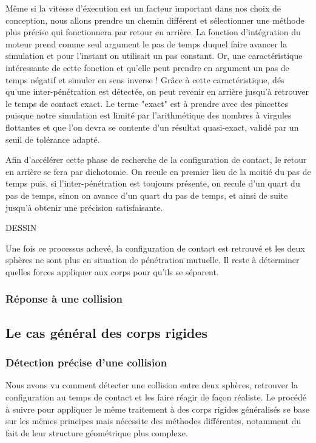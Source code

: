 \documentclass[twocolumn]{article}
\begin{document}
Même si la vitesse d'éxecution est un facteur important dans nos choix de conception, nous allons prendre un chemin différent et sélectionner une méthode plus précise qui fonctionnera par retour en arrière. La fonction d'intégration du moteur prend comme seul argument le pas de temps duquel faire avancer la simulation et pour l'instant on utilisait un pas constant. Or, une caractéristique intéressante de cette fonction et qu'elle peut prendre en argument un pas de temps négatif et simuler en sens inverse ! Grâce à cette caractéristique, dés qu'une inter-pénétration est détectée, on peut revenir en arrière jusqu'à retrouver le temps de contact exact. Le terme "exact" est à prendre avec des pincettes puisque notre simulation est limité par l'arithmétique des nombres à virgules flottantes et que l'on devra se contente d'un résultat quasi-exact, validé par un seuil de tolérance adapté.

Afin d'accélérer cette phase de recherche de la configuration de contact, le retour en arrière se fera par dichotomie. On recule en premier lieu de la moitié du pas de temps puis, si l'inter-pénétration est toujours présente, on recule d'un quart du pas de temps, sinon on avance d'un quart du pas de temps, et ainsi de suite jusqu'à obtenir une précision satisfaisante.

DESSIN

Une fois ce processus achevé, la configuration de contact est retrouvé et les deux sphères ne sont plus en situation de pénétration mutuelle. Il reste à déterminer quelles forces appliquer aux corps pour qu'ils se séparent.

\subsubsection{Réponse à une collision}



\subsection{Le cas général des corps rigides}

\subsubsection{Détection précise d'une collision}

Nous avons vu comment détecter une collision entre deux sphères, retrouver la configuration au temps de contact et les faire réagir de façon réaliste. Le procédé à suivre pour appliquer le même traitement à des corps rigides généralisés se base sur les mêmes principes mais nécessite des méthodes différentes, notamment du fait de leur structure géométrique plus complexe.
\end{document}
